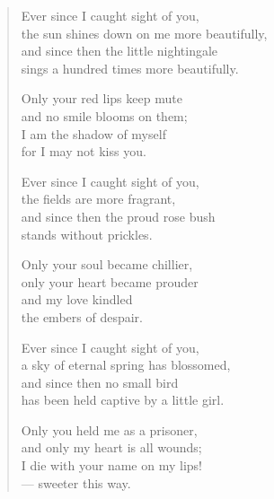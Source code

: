 \documentclass[11pt]{extbook}
\newcommand*{\centeredornament}{\centerline{\pgfornament[width=6cm]{88}}}
\begin{document}


\begin{verse}
  Ever since I caught sight of you, \\
  the sun shines down on me more beautifully, \\
  and since then the little nightingale \\
  sings a hundred times more beautifully.

  Only your red lips keep mute \\
  and no smile blooms on them; \\
  I am the shadow of myself \\
  for I may not kiss you.

  Ever since I caught sight of you, \\
  the fields are more fragrant, \\
  and since then the proud rose bush \\
  stands without prickles.

  Only your soul became chillier, \\
  only your heart became prouder \\
  and my love kindled \\
  the embers of despair.

  Ever since I caught sight of you, \\
  a sky of eternal spring has blossomed, \\
  and since then no small bird \\
  has been held captive by a little girl.

  Only you held me as a prisoner, \\
  and only my heart is all wounds; \\
  I die with your name on my lips! \\
  --- sweeter this way.
\end{verse}

\newpage

\vspace*{-15mm}
\centeredornament


\end{document}
